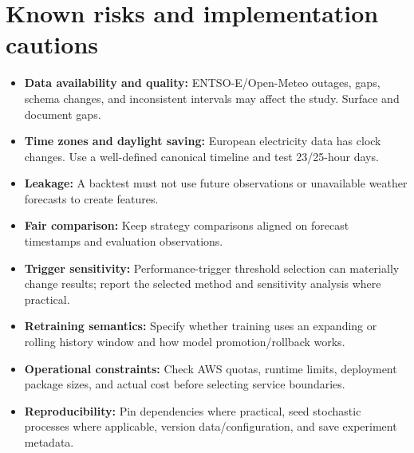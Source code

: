 \documentclass[11pt,a4paper]{article}
\begin{document}
\section{Known risks and implementation cautions}
\begin{itemize}
  \item \textbf{Data availability and quality:} ENTSO-E/Open-Meteo outages, gaps, schema changes, and inconsistent intervals may affect the study. Surface and document gaps.
  \item \textbf{Time zones and daylight saving:} European electricity data has clock changes. Use a well-defined canonical timeline and test 23/25-hour days.
  \item \textbf{Leakage:} A backtest must not use future observations or unavailable weather forecasts to create features.
  \item \textbf{Fair comparison:} Keep strategy comparisons aligned on forecast timestamps and evaluation observations.
  \item \textbf{Trigger sensitivity:} Performance-trigger threshold selection can materially change results; report the selected method and sensitivity analysis where practical.
  \item \textbf{Retraining semantics:} Specify whether training uses an expanding or rolling history window and how model promotion/rollback works.
  \item \textbf{Operational constraints:} Check AWS quotas, runtime limits, deployment package sizes, and actual cost before selecting service boundaries.
  \item \textbf{Reproducibility:} Pin dependencies where practical, seed stochastic processes where applicable, version data/configuration, and save experiment metadata.
\end{itemize}
\end{document}
